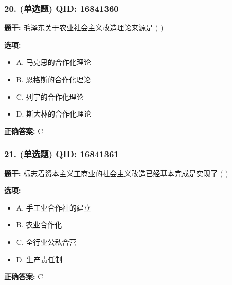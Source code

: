\documentclass[12pt,UTF8]{ctexart}
\begin{document}
\vspace{0.3em}\hrulefill\vspace{0.7em}

\subsubsection*{20. (单选题) \small QID: 16841360}

\textbf{题干:}
毛泽东关于农业社会主义改造理论来源是 ( )

\textbf{选项:}
\begin{itemize}[leftmargin=*]

  \item A. 马克思的合作化理论

  \item B. 恩格斯的合作化理论

  \item C. 列宁的合作化理论

  \item D. 斯大林的合作化理论

\end{itemize}

\textbf{正确答案:}
C

\vspace{0.3em}\hrulefill\vspace{0.7em}

\subsubsection*{21. (单选题) \small QID: 16841361}

\textbf{题干:}
标志着资本主义工商业的社会主义改造已经基本完成是实现了 ( )

\textbf{选项:}
\begin{itemize}[leftmargin=*]

  \item A. 手工业合作社的建立

  \item B. 农业合作化

  \item C. 全行业公私合营

  \item D. 生产责任制

\end{itemize}

\textbf{正确答案:}
C

\vspace{0.3em}\hrulefill\vspace{0.7em}
\end{document}
